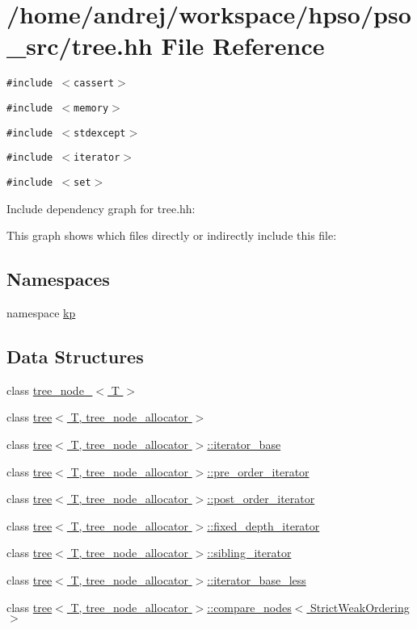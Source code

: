\hypertarget{tree_8hh}{
\section{/home/andrej/workspace/hpso/pso\_\-src/tree.hh File Reference}
\label{tree_8hh}
}
{\tt \#include $<$cassert$>$}\par
{\tt \#include $<$memory$>$}\par
{\tt \#include $<$stdexcept$>$}\par
{\tt \#include $<$iterator$>$}\par
{\tt \#include $<$set$>$}\par


Include dependency graph for tree.hh:

This graph shows which files directly or indirectly include this file:\subsection*{Namespaces}
\begin{CompactItemize}
\item 
namespace \hyperlink{namespacekp}{kp}
\end{CompactItemize}
\subsection*{Data Structures}
\begin{CompactItemize}
\item 
class \hyperlink{classtree__node__}{tree\_\-node\_\-$<$ T $>$}
\item 
class \hyperlink{classtree}{tree$<$ T, tree\_\-node\_\-allocator $>$}
\item 
class \hyperlink{classtree_1_1iterator__base}{tree$<$ T, tree\_\-node\_\-allocator $>$::iterator\_\-base}
\item 
class \hyperlink{classtree_1_1pre__order__iterator}{tree$<$ T, tree\_\-node\_\-allocator $>$::pre\_\-order\_\-iterator}
\item 
class \hyperlink{classtree_1_1post__order__iterator}{tree$<$ T, tree\_\-node\_\-allocator $>$::post\_\-order\_\-iterator}
\item 
class \hyperlink{classtree_1_1fixed__depth__iterator}{tree$<$ T, tree\_\-node\_\-allocator $>$::fixed\_\-depth\_\-iterator}
\item 
class \hyperlink{classtree_1_1sibling__iterator}{tree$<$ T, tree\_\-node\_\-allocator $>$::sibling\_\-iterator}
\item 
class \hyperlink{classtree_1_1iterator__base__less}{tree$<$ T, tree\_\-node\_\-allocator $>$::iterator\_\-base\_\-less}
\item 
class \hyperlink{classtree_1_1compare__nodes}{tree$<$ T, tree\_\-node\_\-allocator $>$::compare\_\-nodes$<$ StrictWeakOrdering $>$}
\end{CompactItemize}
